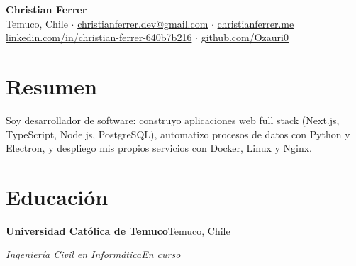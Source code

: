 \documentclass[10pt,letterpaper]{article}
\newcommand{\entry}[4]{%
  \textbf{#1}\hfill #2\par\nopagebreak
  \textit{#3}\hfill \textit{#4}\par\nopagebreak\vspace{0.05em}}
\begin{document}
\begin{center}
  {\LARGE\bfseries Christian Ferrer}\\[0.2em]
  Temuco, Chile $\cdot$ \href{mailto:christianferrer.dev@gmail.com}{christianferrer.dev@gmail.com} $\cdot$
  \href{https://christianferrer.me}{christianferrer.me}\\
  \href{https://www.linkedin.com/in/christian-ferrer-640b7b216/}{linkedin.com/in/christian-ferrer-640b7b216} $\cdot$
  \href{https://github.com/Ozauri0}{github.com/Ozauri0}
\end{center}

\section{Resumen}
Soy desarrollador de software: construyo aplicaciones web full stack (Next.js, TypeScript, Node.js, PostgreSQL), automatizo procesos de datos con Python y Electron, y despliego mis propios servicios con Docker, Linux y Nginx.

\section{Educación}
\entry{Universidad Católica de Temuco}{Temuco, Chile}{Ingeniería Civil en Informática}{En curso}
\end{document}
